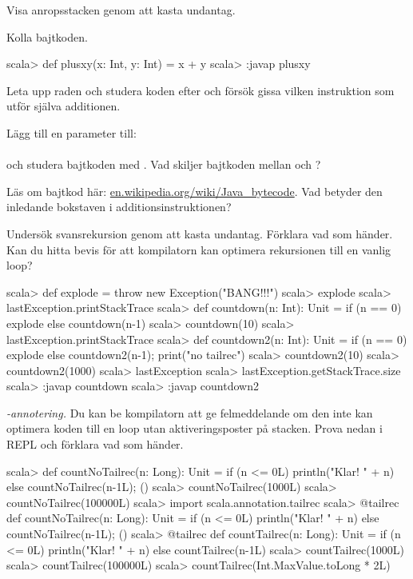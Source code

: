 \ExtraTasks %

\Task Visa anropsstacken genom att kasta undantag.

\AdvancedTasks %



\Task Kolla bajtkoden.
\begin{REPL}
scala> def plusxy(x: Int, y: Int) = x + y
scala> :javap plusxy
\end{REPL}

\Subtask Leta upp raden  och studera koden efter  och försök gissa vilken instruktion som utför själva additionen.

\Subtask Lägg till en parameter till: \\ 
\\ och studera bajtkoden med . Vad skiljer bajtkoden mellan  och ?

\Subtask\Pen Läs om bajtkod här: \href{https://en.wikipedia.org/wiki/Java\_bytecode}{en.wikipedia.org/wiki/Java\_bytecode}. Vad betyder den inledande bokstaven i additionsinstruktionen?


\Task Undersök svansrekursion genom att kasta undantag. Förklara vad som händer. Kan du hitta bevis för att kompilatorn kan optimera rekursionen till en vanlig loop?

\begin{REPL}
scala> def explode = throw new Exception("BANG!!!")
scala> explode
scala> lastException.printStackTrace
scala> def countdown(n: Int): Unit = 
         if (n == 0) explode else countdown(n-1)
scala> countdown(10)
scala> lastException.printStackTrace
scala> def countdown2(n: Int): Unit = 
         if (n == 0) explode else {countdown2(n-1); print("no tailrec")}
scala> countdown2(10)
scala> countdown2(1000)
scala> lastException
scala> lastException.getStackTrace.size
scala> :javap countdown
scala> :javap countdown2
\end{REPL}

\Task \emph{-annotering.} Du kan be kompilatorn att ge felmeddelande om den inte kan optimera koden till en loop utan aktiveringsposter på stacken. Prova nedan i REPL och förklara vad som händer. 
\begin{REPL}
scala> def countNoTailrec(n: Long): Unit = 
         if (n <= 0L) println("Klar! " + n) else {countNoTailrec(n-1L); ()}
scala> countNoTailrec(1000L)
scala> countNoTailrec(100000L) 
scala> import scala.annotation.tailrec
scala> @tailrec def countNoTailrec(n: Long): Unit = 
         if (n <= 0L) println("Klar! " + n) else {countNoTailrec(n-1L); ()}        
scala> @tailrec def countTailrec(n: Long): Unit = 
         if (n <= 0L) println("Klar! " + n) else countTailrec(n-1L)
scala> countTailrec(1000L)
scala> countTailrec(100000L)
scala> countTailrec(Int.MaxValue.toLong * 2L)
\end{REPL}



